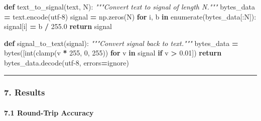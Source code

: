 \documentclass[
  11pt,
  a4paper,
]{article}
\newenvironment{Shaded}{\begin{snugshade}}{\end{snugshade}}
\newcommand{\BuiltInTok}[1]{#1}
\newcommand{\CommentTok}[1]{\textcolor[rgb]{0.56,0.35,0.01}{\textit{#1}}}
\newcommand{\ControlFlowTok}[1]{\textcolor[rgb]{0.13,0.29,0.53}{\textbf{#1}}}
\newcommand{\DecValTok}[1]{\textcolor[rgb]{0.00,0.00,0.81}{#1}}
\newcommand{\FloatTok}[1]{\textcolor[rgb]{0.00,0.00,0.81}{#1}}
\newcommand{\KeywordTok}[1]{\textcolor[rgb]{0.13,0.29,0.53}{\textbf{#1}}}
\newcommand{\NormalTok}[1]{#1}
\newcommand{\OperatorTok}[1]{\textcolor[rgb]{0.81,0.36,0.00}{\textbf{#1}}}
\newcommand{\StringTok}[1]{\textcolor[rgb]{0.31,0.60,0.02}{#1}}
\begin{document}
\begin{Shaded}
\begin{Highlighting}[]
\KeywordTok{def}\NormalTok{ text\_to\_signal(text, N):}
    \CommentTok{"""Convert text to signal of length N."""}
\NormalTok{    bytes\_data }\OperatorTok{=}\NormalTok{ text.encode(}\StringTok{\textquotesingle{}utf{-}8\textquotesingle{}}\NormalTok{)}
\NormalTok{    signal }\OperatorTok{=}\NormalTok{ np.zeros(N)}
    \ControlFlowTok{for}\NormalTok{ i, b }\KeywordTok{in} \BuiltInTok{enumerate}\NormalTok{(bytes\_data[:N]):}
\NormalTok{        signal[i] }\OperatorTok{=}\NormalTok{ b }\OperatorTok{/} \FloatTok{255.0}
    \ControlFlowTok{return}\NormalTok{ signal}

\KeywordTok{def}\NormalTok{ signal\_to\_text(signal):}
    \CommentTok{"""Convert signal back to text."""}
\NormalTok{    bytes\_data }\OperatorTok{=} \BuiltInTok{bytes}\NormalTok{([}\BuiltInTok{int}\NormalTok{(clamp(v }\OperatorTok{*} \DecValTok{255}\NormalTok{, }\DecValTok{0}\NormalTok{, }\DecValTok{255}\NormalTok{)) }\ControlFlowTok{for}\NormalTok{ v }\KeywordTok{in}\NormalTok{ signal }\ControlFlowTok{if}\NormalTok{ v }\OperatorTok{\textgreater{}} \FloatTok{0.01}\NormalTok{])}
    \ControlFlowTok{return}\NormalTok{ bytes\_data.decode(}\StringTok{\textquotesingle{}utf{-}8\textquotesingle{}}\NormalTok{, errors}\OperatorTok{=}\StringTok{\textquotesingle{}ignore\textquotesingle{}}\NormalTok{)}
\end{Highlighting}
\end{Shaded}

\begin{center}\rule{0.5\linewidth}{0.5pt}\end{center}

\subsubsection{7. Results}\label{results-2}

\paragraph{7.1 Round-Trip Accuracy}\label{round-trip-accuracy}
\end{document}
